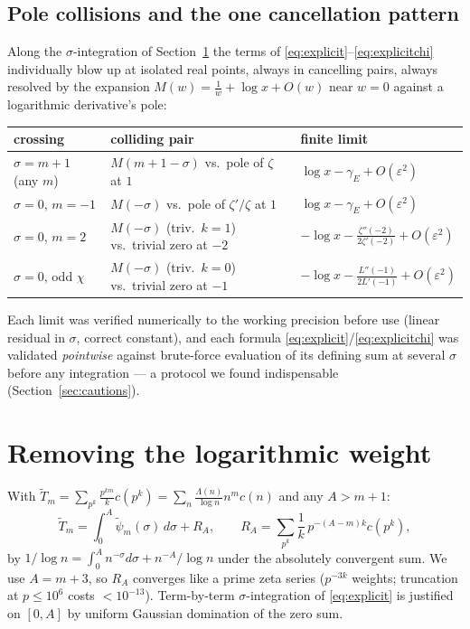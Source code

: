 \documentclass[11pt]{article}
\newcommand{\eps}{\varepsilon}
\begin{document}
\subsection*{Pole collisions and the one cancellation pattern}
Along the $\sigma$-integration of Section~\ref{sec:logstrip} the terms of
\eqref{eq:explicit}--\eqref{eq:explicitchi} individually blow up at
isolated real points, always in cancelling pairs, always resolved by the
expansion $M(w)=\frac1w+\log x+O(w)$ near $w=0$ against a logarithmic
derivative's pole:
\begin{center}
\begin{tabular}{lll}
\toprule
crossing & colliding pair & finite limit \\
\midrule
$\sigma=m+1$ (any $m$) & $M(m+1-\sigma)$ vs.\ pole of $\zeta$ at $1$ &
$\log x-\gamma_E+O(\eps^2)$ \\
$\sigma=0$, $m=-1$ & $M(-\sigma)$ vs.\ pole of $\zeta'/\zeta$ at $1$ &
$\log x-\gamma_E+O(\eps^2)$ \\
$\sigma=0$, $m=2$ & $M(-\sigma)$ (triv.\ $k=1$) vs.\ trivial zero at $-2$ &
$-\log x-\tfrac{\zeta''(-2)}{2\zeta'(-2)}+O(\eps^2)$ \\
$\sigma=0$, odd $\chi$ & $M(-\sigma)$ (triv.\ $k=0$) vs.\ trivial zero at
$-1$ & $-\log x-\tfrac{L''(-1)}{2L'(-1)}+O(\eps^2)$ \\
\bottomrule
\end{tabular}
\end{center}
Each limit was verified numerically to the working precision before use
(linear residual in $\sigma$, correct constant), and each formula
\eqref{eq:explicit}/\eqref{eq:explicitchi} was validated \emph{pointwise}
against brute-force evaluation of its defining sum at several $\sigma$
before any integration --- a protocol we found indispensable
(Section~\ref{sec:cautions}).

\section{Removing the logarithmic weight}\label{sec:logstrip}

With $\widetilde T_m=\sum_{p^k}\frac{p^{km}}{k}c(p^k)
=\sum_n\frac{\Lambda(n)}{\log n}n^{m}c(n)$ and any $A>m+1$:
\begin{equation}\label{eq:logstrip}
  \widetilde T_m=\int_0^A\widetilde\psi_m(\sigma)\,d\sigma+R_A,\qquad
  R_A=\sum_{p^k}\frac1k\,p^{-(A-m)k}c(p^k),
\end{equation}
by $1/\log n=\int_0^A n^{-\sigma}d\sigma+n^{-A}/\log n$ under the
absolutely convergent sum. We use $A=m+3$, so $R_A$ converges like a prime
zeta series ($p^{-3k}$ weights; truncation at $p\le10^6$ costs
$<10^{-13}$). Term-by-term $\sigma$-integration of \eqref{eq:explicit} is
justified on $[0,A]$ by uniform Gaussian domination of the zero sum.
\end{document}
